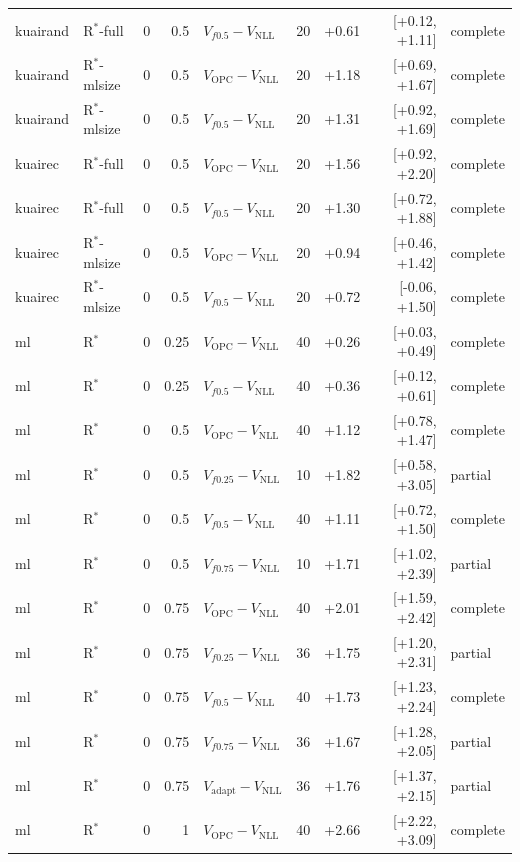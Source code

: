 \documentclass[10pt,a4paper]{article}
\begin{document}
{\begin{longtable}{llrrlrrrl}
kuairand & R$^*$-full & 0 & 0.5 & $V_{f0.5}-V_{\mathrm{NLL}}$ & 20 & +0.61 & [+0.12, +1.11] & complete \\
kuairand & R$^*$-mlsize & 0 & 0.5 & $V_{\mathrm{OPC}}-V_{\mathrm{NLL}}$ & 20 & +1.18 & [+0.69, +1.67] & complete \\
kuairand & R$^*$-mlsize & 0 & 0.5 & $V_{f0.5}-V_{\mathrm{NLL}}$ & 20 & +1.31 & [+0.92, +1.69] & complete \\
kuairec & R$^*$-full & 0 & 0.5 & $V_{\mathrm{OPC}}-V_{\mathrm{NLL}}$ & 20 & +1.56 & [+0.92, +2.20] & complete \\
kuairec & R$^*$-full & 0 & 0.5 & $V_{f0.5}-V_{\mathrm{NLL}}$ & 20 & +1.30 & [+0.72, +1.88] & complete \\
kuairec & R$^*$-mlsize & 0 & 0.5 & $V_{\mathrm{OPC}}-V_{\mathrm{NLL}}$ & 20 & +0.94 & [+0.46, +1.42] & complete \\
kuairec & R$^*$-mlsize & 0 & 0.5 & $V_{f0.5}-V_{\mathrm{NLL}}$ & 20 & +0.72 & [-0.06, +1.50] & complete \\
ml & R$^*$ & 0 & 0.25 & $V_{\mathrm{OPC}}-V_{\mathrm{NLL}}$ & 40 & +0.26 & [+0.03, +0.49] & complete \\
ml & R$^*$ & 0 & 0.25 & $V_{f0.5}-V_{\mathrm{NLL}}$ & 40 & +0.36 & [+0.12, +0.61] & complete \\
ml & R$^*$ & 0 & 0.5 & $V_{\mathrm{OPC}}-V_{\mathrm{NLL}}$ & 40 & +1.12 & [+0.78, +1.47] & complete \\
ml & R$^*$ & 0 & 0.5 & $V_{f0.25}-V_{\mathrm{NLL}}$ & 10 & +1.82 & [+0.58, +3.05] & partial \\
ml & R$^*$ & 0 & 0.5 & $V_{f0.5}-V_{\mathrm{NLL}}$ & 40 & +1.11 & [+0.72, +1.50] & complete \\
ml & R$^*$ & 0 & 0.5 & $V_{f0.75}-V_{\mathrm{NLL}}$ & 10 & +1.71 & [+1.02, +2.39] & partial \\
ml & R$^*$ & 0 & 0.75 & $V_{\mathrm{OPC}}-V_{\mathrm{NLL}}$ & 40 & +2.01 & [+1.59, +2.42] & complete \\
ml & R$^*$ & 0 & 0.75 & $V_{f0.25}-V_{\mathrm{NLL}}$ & 36 & +1.75 & [+1.20, +2.31] & partial \\
ml & R$^*$ & 0 & 0.75 & $V_{f0.5}-V_{\mathrm{NLL}}$ & 40 & +1.73 & [+1.23, +2.24] & complete \\
ml & R$^*$ & 0 & 0.75 & $V_{f0.75}-V_{\mathrm{NLL}}$ & 36 & +1.67 & [+1.28, +2.05] & partial \\
ml & R$^*$ & 0 & 0.75 & $V_{\mathrm{adapt}}-V_{\mathrm{NLL}}$ & 36 & +1.76 & [+1.37, +2.15] & partial \\
ml & R$^*$ & 0 & 1 & $V_{\mathrm{OPC}}-V_{\mathrm{NLL}}$ & 40 & +2.66 & [+2.22, +3.09] & complete \\

\end{longtable}}
\end{document}
